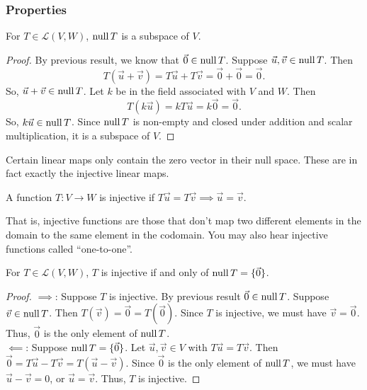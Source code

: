 \subsubsection{Properties}
\begin{theorem}
	For $T \in \mathcal{L}(V,W)$, $\operatorname{null}{T}$ is a subspace of $V$.
\end{theorem}
\begin{proof}
	By previous result, we know that $\vec{0} \in \operatorname{null}{T}$.
	Suppose $\vec{u}, \vec{v} \in \operatorname{null}{T}$.
	Then
	\begin{equation*}
		T(\vec{u} + \vec{v}) = T\vec{u} + T\vec{v} = \vec{0} + \vec{0} = \vec{0}.
	\end{equation*}
	So, $\vec{u} + \vec{v} \in \operatorname{null}{T}$.
	Let $k$ be in the field associated with $V$ and $W$.
	Then
	\begin{equation*}
		T(k\vec{u}) = kT\vec{u} = k\vec{0} = \vec{0}.
	\end{equation*}
	So, $k\vec{u} \in \operatorname{null}{T}$.
	Since $\operatorname{null}{T}$ is non-empty and closed under addition and scalar multiplication, it is a subspace of $V$.
\end{proof}

Certain linear maps only contain the zero vector in their null space.
These are in fact exactly the injective linear maps.

\begin{definition}
	A function $T: V \to W$ is injective if $T\vec{u} = T\vec{v} \implies \vec{u} = \vec{v}$.
\end{definition}
That is, injective functions are those that don't map two different elements in the domain to the same element in the codomain.
You may also hear injective functions called ``one-to-one''.

\begin{theorem}
	For $T \in \mathcal{L}(V,W)$, $T$ is injective if and only of $\operatorname{null}{T} = \{\vec{0}\}$.
\end{theorem}
\begin{proof}
	$\implies$: Suppose $T$ is injective.
	By previous result $\vec{0} \in \operatorname{null}{T}$.
	Suppose $\vec{v} \in \operatorname{null}{T}$.
	Then $T(\vec{v}) = \vec{0} = T(\vec{0})$.
	Since $T$ is injective, we must have $\vec{v} = \vec{0}$.
	Thus, $\vec{0}$ is the only element of $\operatorname{null}{T}$. \\
	
	$\impliedby$: Suppose $\operatorname{null}{T} = \{\vec{0}\}$.
	Let $\vec{u}, \vec{v} \in V$ with $T\vec{u} = T\vec{v}$.
	Then $\vec{0} = T\vec{u} - T\vec{v} = T(\vec{u} - \vec{v})$.
	Since $\vec{0}$ is the only element of $\operatorname{null}{T}$, we must have $\vec{u} - \vec{v} = 0$, or $\vec{u} = \vec{v}$.
	Thus, $T$ is injective.
\end{proof}